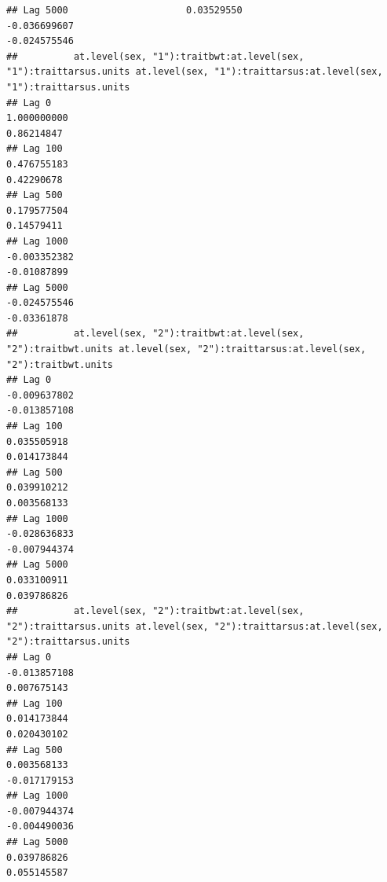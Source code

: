 \documentclass[
  12pt,
]{book}
\begin{document}
\begin{verbatim}
## Lag 5000                     0.03529550                                                  -0.036699607                                                     -0.024575546
##          at.level(sex, "1"):traitbwt:at.level(sex, "1"):traittarsus.units at.level(sex, "1"):traittarsus:at.level(sex, "1"):traittarsus.units
## Lag 0                                                         1.000000000                                                          0.86214847
## Lag 100                                                       0.476755183                                                          0.42290678
## Lag 500                                                       0.179577504                                                          0.14579411
## Lag 1000                                                     -0.003352382                                                         -0.01087899
## Lag 5000                                                     -0.024575546                                                         -0.03361878
##          at.level(sex, "2"):traitbwt:at.level(sex, "2"):traitbwt.units at.level(sex, "2"):traittarsus:at.level(sex, "2"):traitbwt.units
## Lag 0                                                     -0.009637802                                                     -0.013857108
## Lag 100                                                    0.035505918                                                      0.014173844
## Lag 500                                                    0.039910212                                                      0.003568133
## Lag 1000                                                  -0.028636833                                                     -0.007944374
## Lag 5000                                                   0.033100911                                                      0.039786826
##          at.level(sex, "2"):traitbwt:at.level(sex, "2"):traittarsus.units at.level(sex, "2"):traittarsus:at.level(sex, "2"):traittarsus.units
## Lag 0                                                        -0.013857108                                                         0.007675143
## Lag 100                                                       0.014173844                                                         0.020430102
## Lag 500                                                       0.003568133                                                        -0.017179153
## Lag 1000                                                     -0.007944374                                                        -0.004490036
## Lag 5000                                                      0.039786826                                                         0.055145587

\end{verbatim}
\end{document}
